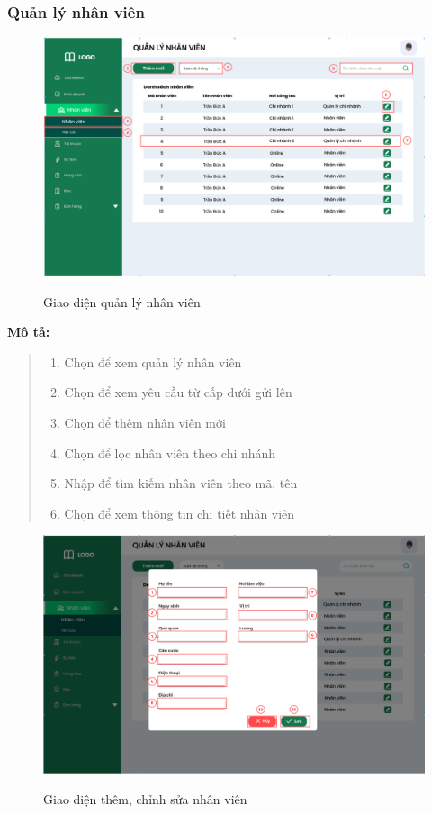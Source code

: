     \newpage
    
    
    \subsubsection{Quản lý nhân viên}
        \begin{figure}[!htp]
            \centering
            \includegraphics[width=12cm]{img/UI/admin/staff.png}
            \label{23}
            \newline
            \caption{Giao diện quản lý nhân viên}
        \end{figure}
        \textbf{Mô tả:}  
        \begin{quote}
            \begin{enumerate}
                \item Chọn để xem quản lý nhân viên
                \item Chọn để xem yêu cầu từ cấp dưới gửi lên
                \item Chọn để thêm nhân viên mới
                \item Chọn để lọc nhân viên theo chi nhánh
                \item Nhập để tìm kiếm nhân viên theo mã, tên
                \item Chọn để xem thông tin chi tiết nhân viên
            \end{enumerate}
        \end{quote}
            \begin{figure}[!htp]
                \centering
                \includegraphics[width=12cm]{img/UI/admin/staff_edit_add.png}
                \label{24}
                \newline
                \caption{Giao diện thêm, chỉnh sửa nhân viên}
            \end{figure}
